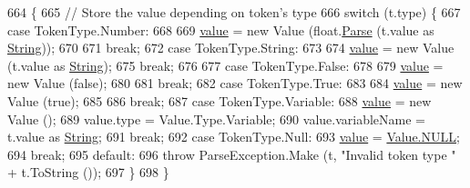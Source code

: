 \begin{DoxyCode}
664                                            \{
665                 \textcolor{comment}{// Store the value depending on token's type}
666                 \textcolor{keywordflow}{switch} (t.type) \{
667                 \textcolor{keywordflow}{case} TokenType.Number:
668 
669                     \hyperlink{a00101_a51ab5939344f9bfa21181c02cf0e341d}{value} = \textcolor{keyword}{new} Value (\textcolor{keywordtype}{float}.\hyperlink{a00078_a811cc7226f4f4a2f3440cdb67ad14468}{Parse} (t.value as \hyperlink{a00040_a301aa7c866593a5b625a8fc158bbeacea27118326006d3829667a400ad23d5d98}{String}));
670 
671                     \textcolor{keywordflow}{break};
672                 \textcolor{keywordflow}{case} TokenType.String:
673 
674                     \hyperlink{a00101_a51ab5939344f9bfa21181c02cf0e341d}{value} = \textcolor{keyword}{new} Value (t.value as \hyperlink{a00040_a301aa7c866593a5b625a8fc158bbeacea27118326006d3829667a400ad23d5d98}{String});
675                     \textcolor{keywordflow}{break};
676 
677                 \textcolor{keywordflow}{case} TokenType.False:
678 
679                     \hyperlink{a00101_a51ab5939344f9bfa21181c02cf0e341d}{value} = \textcolor{keyword}{new} Value (\textcolor{keyword}{false});
680 
681                     \textcolor{keywordflow}{break};
682                 \textcolor{keywordflow}{case} TokenType.True:
683 
684                     \hyperlink{a00101_a51ab5939344f9bfa21181c02cf0e341d}{value} = \textcolor{keyword}{new} Value (\textcolor{keyword}{true});
685 
686                     \textcolor{keywordflow}{break};
687                 \textcolor{keywordflow}{case} TokenType.Variable:
688                     \hyperlink{a00101_a51ab5939344f9bfa21181c02cf0e341d}{value} = \textcolor{keyword}{new} Value ();
689                     value.type = Value.Type.Variable;
690                     value.variableName = t.value as \hyperlink{a00040_a301aa7c866593a5b625a8fc158bbeacea27118326006d3829667a400ad23d5d98}{String};
691                     \textcolor{keywordflow}{break};
692                 \textcolor{keywordflow}{case} TokenType.Null:
693                     \hyperlink{a00101_a51ab5939344f9bfa21181c02cf0e341d}{value} = \hyperlink{a00100_a1ed2964965baca8621c45efa23f37660}{Value.NULL};
694                     \textcolor{keywordflow}{break};
695                 \textcolor{keywordflow}{default}:
696                     \textcolor{keywordflow}{throw} ParseException.Make (t, \textcolor{stringliteral}{"Invalid token type "} + t.ToString ());
697                 \}
698             \}
\end{DoxyCode}


